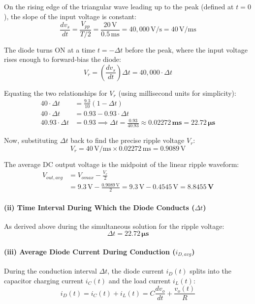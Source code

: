 \documentclass[12pt,a3paper]{article}
\begin{document}
\begin{enumerate}
\begin{tcolorbox}[enhanced,breakable,ansbox,colback=cA!4,colframe=cA,boxrule=0.8pt,arc=5pt,title={\textbf{Answer}},fonttitle=\bfseries\color{white},colbacktitle=cA]
On the rising edge of the triangular wave leading up to the peak (defined at $t=0$), the slope of the input voltage is constant:
\begin{equation*}
    \frac{dv_s}{dt} = \frac{V_{pp}}{T/2} = \frac{20\,\text{V}}{0.5\,\text{ms}} = 40,000\,\text{V/s} = 40\,\text{V/ms}
\end{equation*}

The diode turns ON at a time $t = -\Delta t$ before the peak, where the input voltage rises enough to forward-bias the diode:
\begin{equation*}
    V_r = \left(\frac{dv_s}{dt}\right) \Delta t = 40,000 \cdot \Delta t
\end{equation*}

Equating the two relationships for $V_r$ (using millisecond units for simplicity):
\begin{align*}
    40 \cdot \Delta t &= \frac{9.3}{10} (1 - \Delta t) \\
    40 \cdot \Delta t &= 0.93 - 0.93 \cdot \Delta t \\
    40.93 \cdot \Delta t &= 0.93 \implies \Delta t = \frac{0.93}{40.93} \approx \mathbf{0.02272\,\text{ms} = 22.72\,\mu\text{s}}
\end{align*}

Now, substituting $\Delta t$ back to find the precise ripple voltage $V_r$:
\begin{equation*}
    V_r = 40\,\text{V/ms} \times 0.02272\,\text{ms} = 0.9089\,\text{V}
\end{equation*}

The average DC output voltage is the midpoint of the linear ripple waveform:
\begin{align*}
    V_{out,avg} &= V_{omax} - \frac{V_r}{2} \\
    &= 9.3\,\text{V} - \frac{0.9089\,\text{V}}{2} = 9.3\,\text{V} - 0.4545\,\text{V} = \mathbf{8.8455\,\text{V}}
\end{align*}

\paragraph{(ii) Time Interval During Which the Diode Conducts ($\Delta t$)}
As derived above during the simultaneous solution for the ripple voltage:
\begin{equation*}
    \Delta t = \mathbf{22.72\,\mu\text{s}}
\end{equation*}

\paragraph{(iii) Average Diode Current During Conduction ($i_{D,avg}$)}
During the conduction interval $\Delta t$, the diode current $i_D(t)$ splits into the capacitor charging current $i_C(t)$ and the load current $i_L(t)$:
\begin{equation*}
    i_D(t) = i_C(t) + i_L(t) = C\frac{dv_o}{dt} + \frac{v_o(t)}{R}
\end{equation*}


\end{tcolorbox}
\end{enumerate}
\end{document}

